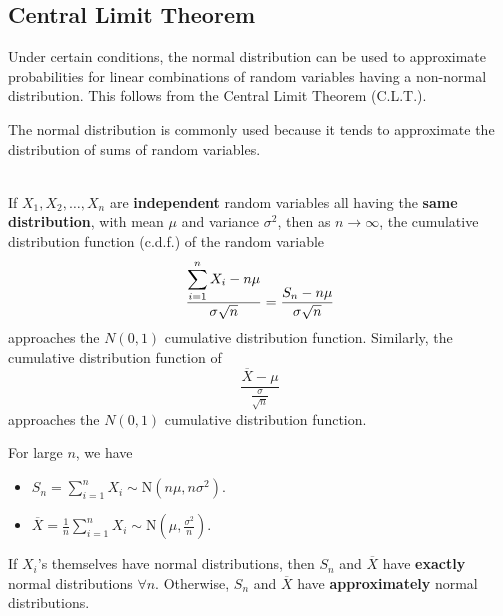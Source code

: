 \subsection{Central Limit Theorem}


Under certain conditions, the normal distribution can be used to approximate probabilities for linear combinations of random variables having a non-normal distribution. This follows from the Central Limit Theorem (C.L.T.). 

The normal distribution is commonly used because it tends to approximate the distribution of sums of random variables.


\begin{theorem}
    \phantom{}  \\
    If $X_1, X_2, \ldots, X_n$ are \textbf{independent} random variables all having the \textbf{same distribution},
    with mean $\mu$ and variance $\sigma^2$, then as $n \to \infty$, the cumulative distribution
    function (c.d.f.) of the random variable
    \[\frac{\displaystyle \sum_{i=1}^n X_i - n\mu}{\sigma \sqrt{n}} = \frac{S_n - n\mu}{\sigma \sqrt{n}}\]
    approaches the $N(0, 1)$ cumulative distribution function. Similarly, the cumulative distribution
    function of 
    \[\frac{\overline{X} - \mu}{\frac{\sigma}{\sqrt{n}}}\]
    approaches the $N(0, 1)$ cumulative distribution function.
\end{theorem}

\begin{remark}
    For large $n$, we have
    \begin{itemize}
        \item $S_n = \displaystyle \sum_{i=1}^{n} X_i \sim \text{N}(n\mu, n\sigma^2)$.
        \item $\overline{X} = \frac{1}{n} \displaystyle \sum_{i=1}^{n} X_i \sim \text{N}(\mu, \frac{\sigma^2}{n})$.
    \end{itemize}
    If $X_i$'s themselves have normal distributions, then $S_n$ and $\overline{X}$ have \textbf{exactly} normal distributions $\forall n$. Otherwise, $S_n$ and $\overline{X}$ have \textbf{approximately} normal distributions.
\end{remark}

\pagebreak

